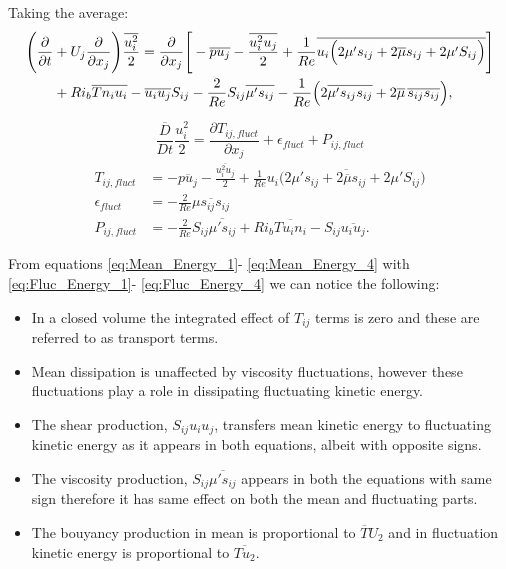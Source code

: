 \documentclass[preprint,12pt]{article}
\begin{document}
Taking the average:
\begin{align}\begin{split}
\Bigg(\frac{\partial}{\partial t}&+U_j\frac{\partial }{\partial x_j}\Bigg)\frac{\overline{u_i^2}}{2}=\frac{\partial}{\partial x_j}\Bigg[-\overline{pu_j}-\frac{\overline{u_i^2u_j}}{2}+\frac{1}{Re}\overline{u_i\Big(2{{\mu'}s_{ij}}+2{\overline{\mu}}s_{ij}+2{{\mu'}}S_{ij}\Big)}\Bigg]\\&+Ri_b\overline{Tn_iu_i}-\overline{u_iu_j}S_{ij}-\frac{2}{Re}S_{ij}\overline{\mu's_{ij}}-\frac{1}{Re}\Big(2\overline{{\mu'}s_{ij}s_{ij}}+2{\overline{\mu}}\hspace{0.02in}\overline{s_{ij}s_{ij}}\Big),
\end{split}\end{align}
\begin{tcolorbox}
\begin{equation}\label{eq:Fluc_Energy_1}
\frac{\overline{D}}{Dt}\frac{u_i^2}{2}=\frac{\partial T_{ij,fluct}}{\partial x_j}+\epsilon_{fluct}+P_{ij,fluct}
\end{equation}
\begin{align}
T_{ij,fluct}&=-\overline{pu_j}-\frac{\overline{u_i^2u_j}}{2}+\frac{1}{Re}\overline{u_i\Big(2{{\mu'}s_{ij}}+2{\overline{\mu}}s_{ij}+2{{\mu'}}S_{ij}\Big)}\label{eq:Fluc_Energy_2}\\
\epsilon_{fluct}&=-\frac{2}{Re}\overline{{\mu}s_{ij}s_{ij}}\label{eq:Fluc_Energy_3}\\
P_{ij,fluct}&=-\frac{2}{Re}S_{ij}\overline{\mu's_{ij}}+Ri_b\overline{Tu_in_i}-S_{ij}\overline{u_iu_j}.\label{eq:Fluc_Energy_4}
\end{align}
\end{tcolorbox}
From equations \eqref{eq:Mean_Energy_1}- \eqref{eq:Mean_Energy_4} with \eqref{eq:Fluc_Energy_1}- \eqref{eq:Fluc_Energy_4} we can notice the following:
\begin{itemize}
	\item In a closed volume the integrated effect of $T_{ij}$ terms is zero and these are referred to as transport terms.
	\item Mean dissipation is unaffected by viscosity fluctuations, however these fluctuations play a role in dissipating fluctuating kinetic energy.
	\item The shear production, $S_{ij}u_iu_j$, transfers mean kinetic energy to fluctuating kinetic energy as it appears in both equations, albeit with opposite signs.
	\item The viscosity production, $S_{ij}\overline{\mu's_{ij}}$ appears in both the equations with same sign therefore it has same effect on both the mean and fluctuating parts.
	\item The bouyancy production in mean is proportional to $\overline{T}U_2$ and in fluctuation kinetic energy is proportional to $\overline{Tu_2}$.
\end{itemize}
\end{document}
